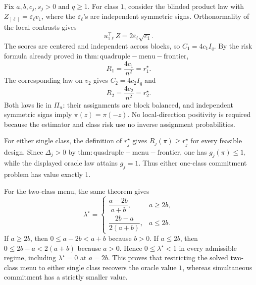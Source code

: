 Fix \(a,b,c_j,s_j>0\) and \(q\ge1\). For class \(1\), consider the blinded product law with \(Z_{[\ell]}=\varepsilon_\ell v_1\), where the \(\varepsilon_\ell\)'s are independent symmetric signs. Orthonormality of the local contrasts gives
\[
u_{1\ell}^\top Z=2\varepsilon_\ell\sqrt{c_1}.
\]
The scores are centered and independent across blocks, so \(C_1=4c_1I_q\). By the risk formula already proved in \(\mathrm{thm:quadruple-menu-frontier}\),
\[
R_1=\frac{4c_1}{n^2}=r_1^\star.
\]
The corresponding law on \(v_2\) gives \(C_2=4c_2I_q\) and
\[
R_2=\frac{4c_2}{n^2}=r_2^\star.
\]
Both laws lie in \(\Pi_n\): their assignments are block balanced, and independent symmetric signs imply \(\pi(z)=\pi(-z)\). No local-direction positivity is required because the estimator and class risk use no inverse assignment probabilities.

For either single class, the definition of \(r_j^\star\) gives \(R_j(\pi)\ge r_j^\star\) for every feasible design. Since \(\Delta_j>0\) by \(\mathrm{thm:quadruple-menu-frontier}\), one has \(g_j(\pi)\le1\), while the displayed oracle law attains \(g_j=1\). Thus either one-class commitment problem has value exactly \(1\).

For the two-class menu, the same theorem gives
\[
\lambda^\star=
\begin{cases}
\dfrac{a-2b}{a+b},&a\ge2b,\\[6pt]
\dfrac{2b-a}{2(a+b)},&a\le2b.
\end{cases}
\]
If \(a\ge2b\), then \(0\le a-2b<a+b\) because \(b>0\). If \(a\le2b\), then \(0\le2b-a<2(a+b)\) because \(a>0\). Hence \(0\le\lambda^\star<1\) in every admissible regime, including \(\lambda^\star=0\) at \(a=2b\). This proves that restricting the solved two-class menu to either single class recovers the oracle value \(1\), whereas simultaneous commitment has a strictly smaller value.